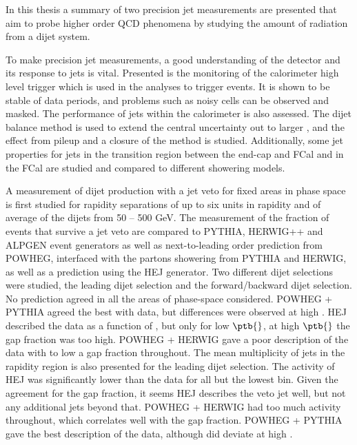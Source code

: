 In this thesis a summary of two precision jet measurements are presented that aim to probe higher order QCD phenomena by studying the amount of radiation from a dijet system.

To make precision jet measurements, a good understanding of the detector and its response to jets is vital. 
Presented is the monitoring of the calorimeter high level trigger which is used in the analyses to trigger events. 
It is shown to be stable of data periods, and problems such as noisy cells can be observed and masked.
The performance of jets within the calorimeter is also assessed.
The dijet \pt{} balance method is used to extend the central uncertainty out to larger \dy{}, and the effect from pileup and a closure of the method is studied. 
Additionally, some jet properties for jets in the transition region between the end-cap and FCal and in the FCal are studied and compared to different showering models.

A measurement of dijet production with a jet veto for fixed areas in phase space is first studied for rapidity separations of up to six units in rapidity and of average \pt{} of the dijets from 50 -- 500 GeV.  
The measurement of the fraction of events that survive a jet veto are compared to PYTHIA, HERWIG++ and ALPGEN event generators as well as next-to-leading order prediction from POWHEG, interfaced with the partons showering from PYTHIA and HERWIG, as well as a prediction using the HEJ generator.
Two different dijet selections were studied, the leading \pt{} dijet selection and the forward/backward dijet selection. 
No prediction agreed in all the areas of phase-space considered.
POWHEG + PYTHIA agreed the best with data, but differences were observed at high \dy{}.
HEJ described the data as a function of \dy{}, but only for low $\ptb{}$, at high $\ptb{}$ the gap fraction was too high.
POWHEG + HERWIG gave a poor description of the data with to low a gap fraction throughout.
The mean multiplicity of jets in the rapidity region is also presented for the leading \pt{} dijet selection.
The activity of HEJ was significantly lower than the data for all but the lowest \dy{} bin. 
Given the agreement for the gap fraction, it seems HEJ describes the veto jet well, but not any additional jets beyond that. 
POWHEG + HERWIG had too much activity throughout, which correlates well with the gap fraction.
POWHEG + PYTHIA gave the best description of the data, although did deviate at high \dy{}.

